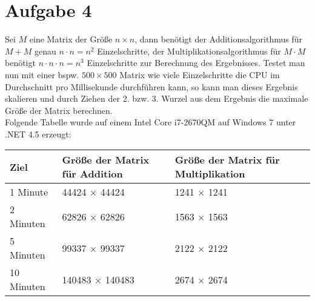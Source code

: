 \section*{Aufgabe 4}
	Sei $M$ eine Matrix der Größe $n \times n$, dann benötigt der Additionsalgorithmus für $M + M$ genau $n \cdot n = n^2$ Einzelschritte, der Multiplikationsalgorithmus für $M \cdot M$ benötigt $n \cdot n \cdot n = n^3$ Einzelschritte zur Berechnung des Ergebnisses. Testet man nun mit einer bspw. $500 \times 500$ Matrix wie viele Einzelschritte die CPU im Durchschnitt pro Millisekunde durchführen kann, so kann man dieses Ergebnis skalieren und durch Ziehen der 2. bzw. 3. Wurzel aus dem Ergebnis die maximale Größe der Matrix berechnen. \\
    Folgende Tabelle wurde auf einem Intel Core i7-2670QM auf Windows 7 unter .NET 4.5 erzeugt: \\[0.5cm]
    
    \bgroup
	\def\arraystretch{1.2}
        \begin{tabularx}{\textwidth}{|l|X|X|}
            \hline
            \textbf{Ziel} & \textbf{Größe der Matrix für Addition} & \textbf{Größe der Matrix für Multiplikation} \\
            \hline
            1 Minute & 44424 $\times$ 44424 & 1241 $\times$ 1241 \\
            \hline
            2 Minuten & 62826 $\times$ 62826 & 1563 $\times$ 1563 \\
            \hline
            5 Minuten & 99337 $\times$ 99337 & 2122 $\times$ 2122 \\
            \hline
            10 Minuten & 140483 $\times$ 140483 & 2674 $\times$ 2674 \\
            \hline
        \end{tabularx}
    \egroup